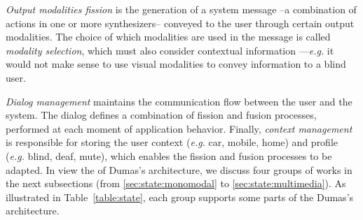 \documentclass[
  doutorado,
  american
]{ThesisPUC}
\newcommand{\tab}[1]{Table~\ref{#1}}
\begin{document}
\textit{Output modalities fission} is the generation of a system message --a
combination of actions in one or more synthesizers-- conveyed to the user
through certain output modalities. The choice of which modalities are used in
the message is called \textit{modality selection}, which must also consider
contextual information —\textit{e.g.} it would not make sense to use visual modalities to
convey information to a blind user. 

\textit{Dialog management} maintains the communication flow between the user 
and the system. The dialog defines a combination of fission and fusion 
processes, performed at each moment of application behavior. Finally, 
\textit{context management} is responsible for storing the user context 
(\textit{e.g.} car, mobile, home) and profile (\textit{e.g.} blind, deaf, 
mute), which enables the fission and fusion processes to be adapted. In view 
the of Dumas’s architecture, we discuss four groups of works in the next 
subsections (from \ref{sec:state:monomodal} to \ref{sec:state:multimedia}). As 
illustrated in \tab{table:state}, each group supports some parts of the Dumas’s 
architecture. 
\end{document}
